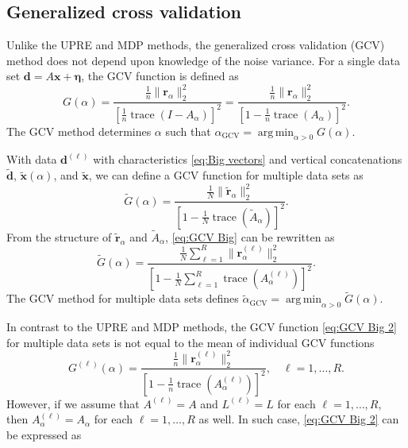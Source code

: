 \documentclass[12pt]{article}
\newcommand{\dVec}{\mathbf{d}}	%
\newcommand{\xVec}{\mathbf{x}}	%
\DeclareMathOperator{\trace}{trace}		%
\newcommand{\regparam}{\alpha}
\DeclareMathOperator*{\argmin}{arg\,min}
\newcommand{\noise}{\eta}	%
\newcommand{\noiseVec}{\bm{\noise}}	%
\newcommand{\regres}{\mathbf{r}_{\regparam}}	%
\newcommand{\A}{A_{\regparam}}	%
\newcommand{\G}{G}	%
\newcommand{\GCV}{\text{GCV}}	%
\begin{document}
\subsection{Generalized cross validation} \label{sec:GCV}
Unlike the UPRE and MDP methods, the generalized cross validation (GCV) method \cite{Wahba1977,Wahba1990} does not depend upon knowledge of the noise variance. For a single data set $\dVec = A\xVec + \noiseVec$, the GCV function is defined as
\begin{equation}
\label{eq:GCV}
\G(\regparam) = \frac{\frac{1}{n}\|\regres\|_2^2}{\left[\frac{1}{n}\trace(I-\A)\right]^2} = \frac{\frac{1}{n}\|\regres\|_2^2}{\left[1 - \frac{1}{n}\trace(\A)\right]^2}.
\end{equation}
The GCV method determines $\regparam$ such that $\regparam_\GCV = \argmin_{\regparam > 0} \G(\regparam)$. \par 
With data $\dVec^{(\ell)}$ with characteristics \eqref{eq:Big vectors} and vertical concatenations $\widetilde{\dVec}$, $\widetilde{\xVec}(\regparam)$, and $\widetilde{\xVec}$, we can define a GCV function for multiple data sets as
\begin{equation}
\label{eq:GCV Big}
\widetilde{\G}(\regparam) = \frac{\frac{1}{N}\|\widetilde{\mathbf{r}}_\regparam\|_2^2}{\left[1 - \frac{1}{N}\trace(\widetilde{A}_\regparam)\right]^2}.
\end{equation}
From the structure of $\widetilde{\mathbf{r}}_\regparam$ and $\widetilde{A}_\regparam$, \eqref{eq:GCV Big} can be rewritten as
\begin{equation}
\label{eq:GCV Big 2}
\widetilde{\G}(\regparam) = \frac{\frac{1}{N}\sum_{\ell=1}^R \|\regres^{(\ell)}\|_2^2}{\left[1 - \frac{1}{N}\sum_{\ell=1}^R \trace\left(\A^{(\ell)}\right)\right]^2}.
\end{equation}
The GCV method for multiple data sets defines $\widetilde{\regparam}_{\textrm{GCV}} = \argmin_{\regparam > 0} \widetilde{\G}(\regparam)$. \par 
In contrast to the UPRE and MDP methods, the GCV function \eqref{eq:GCV Big 2} for multiple data sets is not equal to the mean of individual GCV functions
\begin{equation}
\label{eq:Individual GCV}
\G^{(\ell)}(\regparam) = \frac{\frac{1}{n}\|\regres^{(\ell)}\|_2^2}{\left[1 - \frac{1}{n}\trace\left(\A^{(\ell)}\right)\right]^2}, \quad \ell = 1,\ldots,R.
\end{equation}
However, if we assume that $A^{(\ell)} = A$ and $L^{(\ell)} = L$ for each $\ell = 1,\ldots,R$, then $\A^{(\ell)} = \A$ for each $\ell = 1,\ldots,R$ as well. In such case, \eqref{eq:GCV Big 2} can be expressed as
\end{document}
